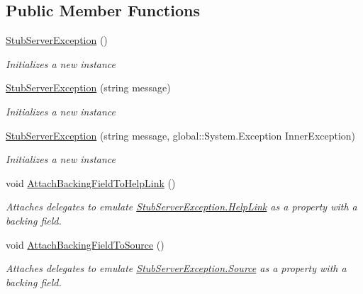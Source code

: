 \subsection*{Public Member Functions}
\begin{DoxyCompactItemize}
\item 
\hyperlink{class_system_1_1_runtime_1_1_remoting_1_1_fakes_1_1_stub_server_exception_a3df728d92eae7373ddb06ae337b2ee4a}{Stub\-Server\-Exception} ()
\begin{DoxyCompactList}\small\item\em Initializes a new instance\end{DoxyCompactList}\item 
\hyperlink{class_system_1_1_runtime_1_1_remoting_1_1_fakes_1_1_stub_server_exception_a9739f8c2616332f085c8770496d09724}{Stub\-Server\-Exception} (string message)
\begin{DoxyCompactList}\small\item\em Initializes a new instance\end{DoxyCompactList}\item 
\hyperlink{class_system_1_1_runtime_1_1_remoting_1_1_fakes_1_1_stub_server_exception_a35bde79e2412d3e14129c9d4c05a7a30}{Stub\-Server\-Exception} (string message, global\-::\-System.\-Exception Inner\-Exception)
\begin{DoxyCompactList}\small\item\em Initializes a new instance\end{DoxyCompactList}\item 
void \hyperlink{class_system_1_1_runtime_1_1_remoting_1_1_fakes_1_1_stub_server_exception_a4feda45f99ef7135063a45d6d1bc9e7e}{Attach\-Backing\-Field\-To\-Help\-Link} ()
\begin{DoxyCompactList}\small\item\em Attaches delegates to emulate \hyperlink{class_system_1_1_runtime_1_1_remoting_1_1_fakes_1_1_stub_server_exception_aa3637549a7f9c56ef1c736158edce2f8}{Stub\-Server\-Exception.\-Help\-Link} as a property with a backing field.\end{DoxyCompactList}\item 
void \hyperlink{class_system_1_1_runtime_1_1_remoting_1_1_fakes_1_1_stub_server_exception_a2023ebaf4bffc042906a48ba8e59e93a}{Attach\-Backing\-Field\-To\-Source} ()
\begin{DoxyCompactList}\small\item\em Attaches delegates to emulate \hyperlink{class_system_1_1_runtime_1_1_remoting_1_1_fakes_1_1_stub_server_exception_aaf07a00514aba6020948a3b00747ad44}{Stub\-Server\-Exception.\-Source} as a property with a backing field.\end{DoxyCompactList}\item 

\end{DoxyCompactItemize}
